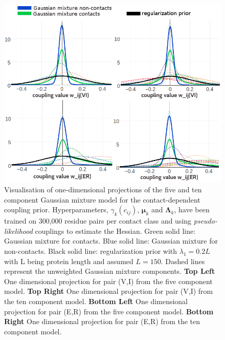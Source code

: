 \documentclass[11pt,a4paper,twoside]{book}
\newcommand{\eq}{\!=\!}
\newcommand{\Lk}{\mathbf{\Lambda}_k}
\newcommand{\muk}{\mathbf{\mu}_k}
\newcommand{\cij}{c_{ij}}
\theoremstyle{definition}
\theoremstyle{definition}
\theoremstyle{remark}
\begin{document}
\begin{figure}
\includegraphics[width=1\linewidth]{img/bayesian_model/pll/1dvis_combined_5comp_10comp_300k} \caption{Visualisation of one-dimensional
projections of the five and ten component Gaussian mixture model for the
contact-dependent coupling prior. Hyperparameters, \(\gamma_k(\cij)\),
\(\muk\) and \(\Lk\), have been trained on 300,000 residue pairs per
contact class and using \emph{pseudo-likelihood} couplings to estimate
the Hessian. Green solid line: Gaussian mixture for contacts. Blue solid
line: Gaussian mixture for non-contacts. Black solid line:
regularization prior with \(\lambda_1 \eq 0.2L\) with L being protein
length and assumed \(L\eq150\). Dashed lines represent the unweighted
Gaussian mixture components. \textbf{Top Left} One dimensional
projection for pair (V,I) from the five component model. \textbf{Top
Right} One dimensional projection for pair (V,I) from the ten component
model. \textbf{Bottom Left} One dimensional projection for pair (E,R)
from the five component model. \textbf{Bottom Right} One dimensional
projection for pair (E,R) from the ten component model.}\label{fig:vis1d-pll-5-10-comp-300k}
\end{figure}
\end{document}

